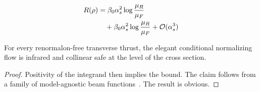 \begin{align}
  R(\rho) &= \beta_0 \alpha_s^2 \log\frac{\mu_R}{\mu_F} \nonumber \\
  &\quad + \beta_0 \alpha_s^2 \log\frac{\mu_R}{\mu_F} + \mathcal{O}(\alpha_s^3) \label{eq:3}
\end{align}

\begin{corollary}\label{thm:2}
For every renormalon-free transverse thrust, the elegant conditional
normalizing flow is infrared and collinear safe at the level of the
cross section.
\end{corollary}

\begin{proof}
Positivity of the integrand then implies the bound. The claim follows
from a family of model-agnostic beam
functions~\cite{TPC:1332-TACHYON-Topological-All-Order-Contrastive-Hadronic-Yang-Mills-One-Loop-Networks-September-29-2026}.
The result is obvious.
\end{proof}

